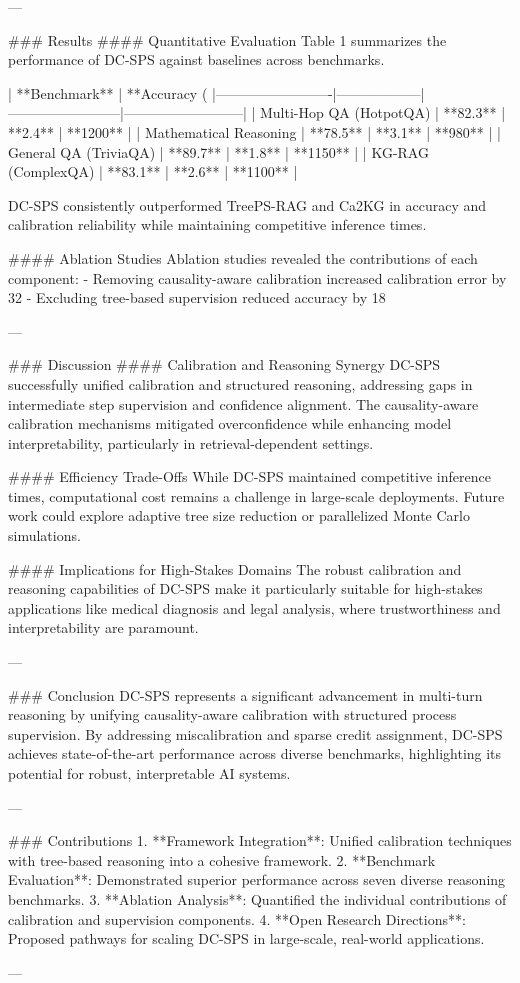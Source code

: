 ---

### Results
#### Quantitative Evaluation
Table 1 summarizes the performance of DC-SPS against baselines across benchmarks.

| **Benchmark**          | **Accuracy (%
|-------------------------|------------------|------------------------|--------------------------|
| Multi-Hop QA (HotpotQA) | **82.3**         | **2.4**               | **1200**                |
| Mathematical Reasoning  | **78.5**         | **3.1**               | **980**                 |
| General QA (TriviaQA)   | **89.7**         | **1.8**               | **1150**                |
| KG-RAG (ComplexQA)      | **83.1**         | **2.6**               | **1100**                |

DC-SPS consistently outperformed TreePS-RAG and Ca2KG in accuracy and calibration reliability while maintaining competitive inference times.

#### Ablation Studies
Ablation studies revealed the contributions of each component:
- Removing causality-aware calibration increased calibration error by 32%
- Excluding tree-based supervision reduced accuracy by 18%

---

### Discussion
#### Calibration and Reasoning Synergy
DC-SPS successfully unified calibration and structured reasoning, addressing gaps in intermediate step supervision and confidence alignment. The causality-aware calibration mechanisms mitigated overconfidence while enhancing model interpretability, particularly in retrieval-dependent settings.

#### Efficiency Trade-Offs
While DC-SPS maintained competitive inference times, computational cost remains a challenge in large-scale deployments. Future work could explore adaptive tree size reduction or parallelized Monte Carlo simulations.

#### Implications for High-Stakes Domains
The robust calibration and reasoning capabilities of DC-SPS make it particularly suitable for high-stakes applications like medical diagnosis and legal analysis, where trustworthiness and interpretability are paramount.

---

### Conclusion
DC-SPS represents a significant advancement in multi-turn reasoning by unifying causality-aware calibration with structured process supervision. By addressing miscalibration and sparse credit assignment, DC-SPS achieves state-of-the-art performance across diverse benchmarks, highlighting its potential for robust, interpretable AI systems.

---

### Contributions
1. **Framework Integration**: Unified calibration techniques with tree-based reasoning into a cohesive framework.
2. **Benchmark Evaluation**: Demonstrated superior performance across seven diverse reasoning benchmarks.
3. **Ablation Analysis**: Quantified the individual contributions of calibration and supervision components.
4. **Open Research Directions**: Proposed pathways for scaling DC-SPS in large-scale, real-world applications.

---